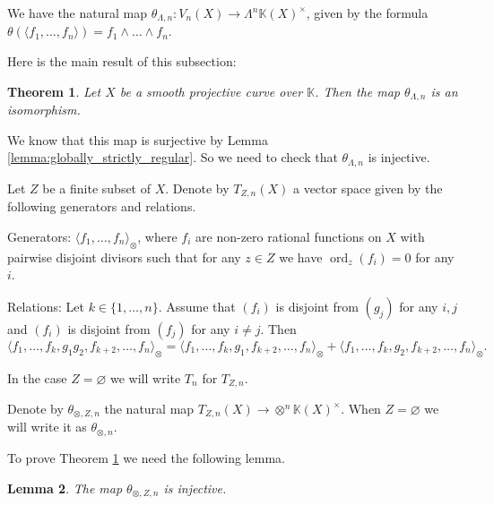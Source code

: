 \documentclass[12pt]{extarticle}
\newtheorem{theorem}{Theorem}[section]
\newtheorem{lemma}[theorem]{Lemma}
\def\mb{\mathbb}
\def\k{\mb K}
\def\wdw{\wedge\dots\wedge}
\def\bs{\backslash}
\newcommand{\EP}[2]{{\Lambda^{#1}\k(#2)^\times}}
\DeclareMathOperator{\ord}{ord}
\begin{document}
We have the natural map $\theta_{\Lambda,n}\colon V_n(X)\to \EP{n}{X}$, given by the formula $\theta(\langle f_1,\dots, f_n\rangle)=f_1\wdw f_n$. 

Here is the main result of this subsection:

\begin{theorem}
\label{th:theta_is_an_isomorphsim}
    Let $X$ be a smooth projective curve over $\k$. Then the map $\theta_{\Lambda,n}$ is an isomorphism.
\end{theorem}

We know that this map is surjective by Lemma \ref{lemma:globally_strictly_regular}. So we need to check that $\theta_{\Lambda,n}$ is injective.

Let $Z$ be a finite subset of $X$. Denote by $T_{Z,n}(X)$ a vector space given by the following generators and relations. 

Generators: $\langle f_1,\dots,f_n\rangle_\otimes$, where $f_i$ are non-zero rational functions on $X$ with pairwise disjoint divisors such that for any $z\in Z$ we have $\ord_z(f_i)=0$ for any $i$. 

Relations: Let $k\in\{1,\dots, n\}$. Assume that $(f_i)$ is disjoint from $(g_j)$ for any $i,j$ and $(f_i)$ is disjoint from $(f_j)$ for any $i\ne j$. Then $$\langle f_1,\dots, f_k,g_1g_2,f_{k+2},\dots, f_n\rangle_\otimes=\langle f_1,\dots, f_k,g_1,f_{k+2},\dots, f_n\rangle_\otimes+\langle f_1,\dots, f_k,g_2,f_{k+2},\dots, f_n\rangle_\otimes.$$ 

In the case $Z=\varnothing$ we will write $T_{n}$ for $T_{Z,n}$.


Denote by $\theta_{\otimes,Z,n}$ the natural map $T_{Z,n}(X)\to \otimes^n\k(X)^\times$. When $Z=\varnothing$ we will write it as $\theta_{\otimes,n}$.

To prove Theorem \ref{th:theta_is_an_isomorphsim} we need the following lemma. 

\begin{lemma}
\label{prop:theta_tensor_is_injective}
    The map $\theta_{\otimes,Z,n}$ is injective.
\end{lemma}
\end{document}
